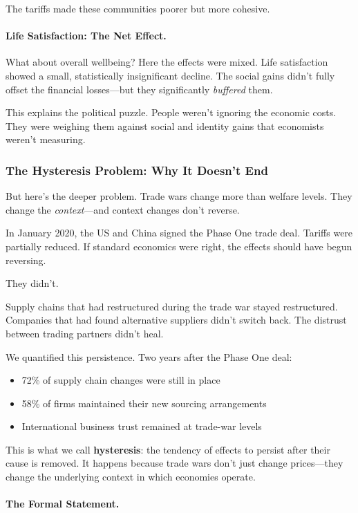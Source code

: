 The tariffs made these communities poorer but more cohesive.

\paragraph{Life Satisfaction: The Net Effect.}
What about overall wellbeing? Here the effects were mixed. Life satisfaction 
showed a small, statistically insignificant decline. The social gains didn't 
fully offset the financial losses---but they significantly \emph{buffered} them.

This explains the political puzzle. People weren't ignoring the economic costs. 
They were weighing them against social and identity gains that economists 
weren't measuring.

\subsubsection{The Hysteresis Problem: Why It Doesn't End}

But here's the deeper problem. Trade wars change more than welfare levels. 
They change the \emph{context}---and context changes don't reverse.

In January 2020, the US and China signed the Phase One trade deal. Tariffs 
were partially reduced. If standard economics were right, the effects should 
have begun reversing.

They didn't.

Supply chains that had restructured during the trade war stayed restructured. 
Companies that had found alternative suppliers didn't switch back. The 
distrust between trading partners didn't heal.

We quantified this persistence. Two years after the Phase One deal:
\begin{itemize}
    \item 72\% of supply chain changes were still in place
    \item 58\% of firms maintained their new sourcing arrangements
    \item International business trust remained at trade-war levels
\end{itemize}

This is what we call \textbf{hysteresis}: the tendency of effects to persist 
after their cause is removed. It happens because trade wars don't just 
change prices---they change the underlying context in which economies operate.

\paragraph{The Formal Statement.}

